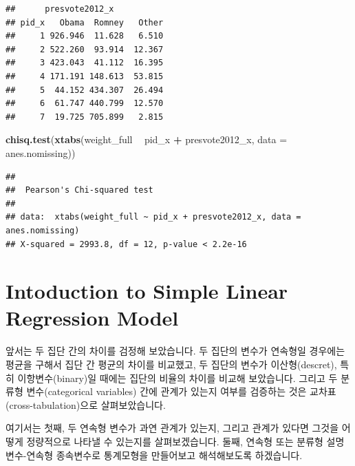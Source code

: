 \documentclass[]{book}
\newenvironment{Shaded}{\begin{snugshade}}{\end{snugshade}}
\newcommand{\CommentTok}[1]{\textcolor[rgb]{0.56,0.35,0.01}{\textit{#1}}}
\newcommand{\DataTypeTok}[1]{\textcolor[rgb]{0.13,0.29,0.53}{#1}}
\newcommand{\KeywordTok}[1]{\textcolor[rgb]{0.13,0.29,0.53}{\textbf{#1}}}
\newcommand{\NormalTok}[1]{#1}
\newcommand{\OperatorTok}[1]{\textcolor[rgb]{0.81,0.36,0.00}{\textbf{#1}}}
\newcommand{\StringTok}[1]{\textcolor[rgb]{0.31,0.60,0.02}{#1}}
\begin{document}
\begin{verbatim}
##      presvote2012_x
## pid_x   Obama  Romney   Other
##     1 926.946  11.628   6.510
##     2 522.260  93.914  12.367
##     3 423.043  41.112  16.395
##     4 171.191 148.613  53.815
##     5  44.152 434.307  26.494
##     6  61.747 440.799  12.570
##     7  19.725 705.899   2.815
\end{verbatim}

\begin{Shaded}
\begin{Highlighting}[]
\KeywordTok{chisq.test}\NormalTok{(}\KeywordTok{xtabs}\NormalTok{(weight_full }\OperatorTok{~}\StringTok{ }\NormalTok{pid_x }\OperatorTok{+}\StringTok{ }\NormalTok{presvote2012_x, }\DataTypeTok{data =}\NormalTok{ anes.nomissing))}
\end{Highlighting}
\end{Shaded}

\begin{verbatim}
## 
##  Pearson's Chi-squared test
## 
## data:  xtabs(weight_full ~ pid_x + presvote2012_x, data = anes.nomissing)
## X-squared = 2993.8, df = 12, p-value < 2.2e-16
\end{verbatim}

\hypertarget{intoduction-to-simple-linear-regression-model}{%
\chapter{Intoduction to Simple Linear Regression Model}\label{intoduction-to-simple-linear-regression-model}}

앞서는 두 집단 간의 차이를 검정해 보았습니다. 두 집단의 변수가 연속형일 경우에는 평균을 구해서 집단 간 평균의 차이를 비교했고, 두 집단의 변수가 이산형(descret), 특히 이항변수(binary)일 때에는 집단의 비율의 차이를 비교해 보았습니다. 그리고 두 분류형 변수(categorical variables) 간에 관계가 있는지 여부를 검증하는 것은 교차표(cross-tabulation)으로 살펴보았습니다.

여기서는 첫째, 두 연속형 변수가 과연 관계가 있는지, 그리고 관계가 있다면 그것을 어떻게 정량적으로 나타낼 수 있는지를 살펴보겠습니다. 둘째, 연속형 또는 분류형 설명변수-연속형 종속변수로 통계모형을 만들어보고 해석해보도록 하겠습니다.

\begin{Shaded}
\end{Shaded}
\end{document}
